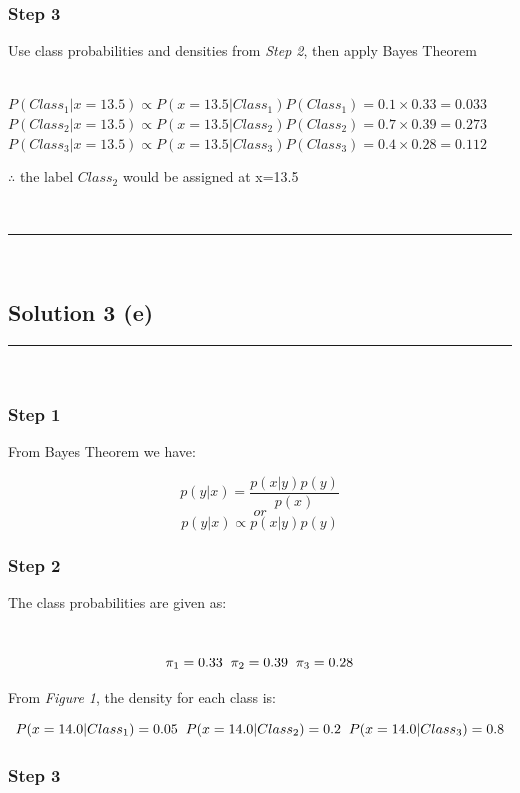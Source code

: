 \documentclass{article}
\begin{document}
\subsubsection*{Step 3}

\parbox{\textwidth}{Use class probabilities and densities from \textit{Step 2}, then apply Bayes Theorem}\\

$P(Class_1|x=13.5) \propto P(x=13.5|Class_1)P(Class_1) = 0.1 \times 0.33 = 0.033$\\

$P(Class_2|x=13.5) \propto P(x=13.5|Class_2)P(Class_2) = 0.7 \times 0.39 = 0.273$\\

$P(Class_3|x=13.5) \propto P(x=13.5|Class_3)P(Class_3) = 0.4 \times 0.28 = 0.112$\\

\parbox{\textwidth}{$\therefore$ the label $Class_2$ would be assigned at x=13.5}\\

\noindent\rule{\textwidth}{0.4pt}\\
\newpage
\subsection*{Solution 3 (e)}

\noindent\rule{\textwidth}{0.4pt}\\

\subsubsection*{Step 1}
\parbox{\textwidth}{From Bayes Theorem we have:}
$$p(y|x) = \frac{p(x|y)p(y)}{p(x)}$$
$$or$$
$$p(y|x) \propto p(x|y)p(y)$$

\subsubsection*{Step 2}
\parbox{\textwidth}{The class probabilities are given as: }\\
$$\pi_1 = 0.33 \hspace{0.2cm} \pi_2 = 0.39 \hspace{0.2cm} \pi_3 = 0.28$$
\parbox{\textwidth}{From \textit{Figure 1}, the density for each class is:}
$$P(x=14.0|Class_1) = 0.05 \hspace{0.2cm} P(x=14.0|Class_2) = 0.2 \hspace{0.2cm} P(x=14.0|Class_3) = 0.8$$

\subsubsection*{Step 3}
\end{document}
